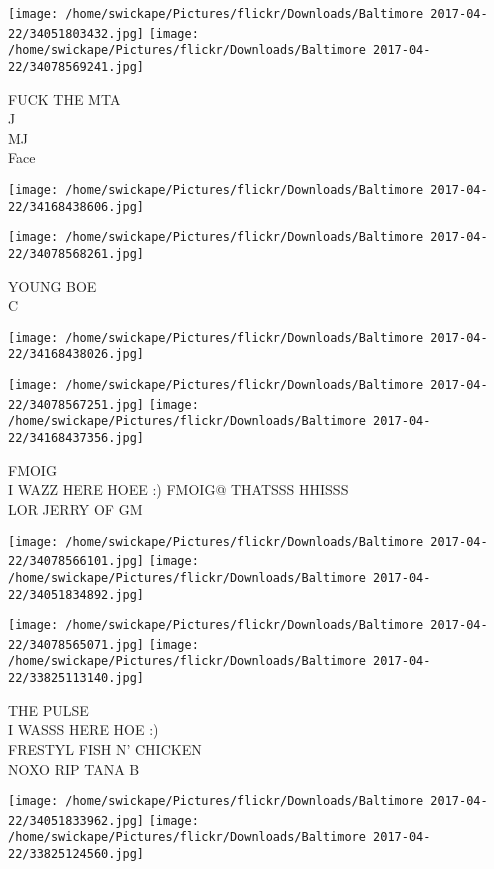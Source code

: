 \documentclass[10pt,letterpaper]{article}
\begin{document}
\texttt{[image: /home/swickape/Pictures/flickr/Downloads/Baltimore 2017-04-22/34051803432.jpg]}
\texttt{[image: /home/swickape/Pictures/flickr/Downloads/Baltimore 2017-04-22/34078569241.jpg]}

FUCK THE MTA\\
J\\
MJ\\
Face
\pagebreak

\texttt{[image: /home/swickape/Pictures/flickr/Downloads/Baltimore 2017-04-22/34168438606.jpg]}

\vspace{0.25in}
\texttt{[image: /home/swickape/Pictures/flickr/Downloads/Baltimore 2017-04-22/34078568261.jpg]}

YOUNG BOE\\
C
\pagebreak

\texttt{[image: /home/swickape/Pictures/flickr/Downloads/Baltimore 2017-04-22/34168438026.jpg]}

\vspace{0.25in}
\texttt{[image: /home/swickape/Pictures/flickr/Downloads/Baltimore 2017-04-22/34078567251.jpg]}
\texttt{[image: /home/swickape/Pictures/flickr/Downloads/Baltimore 2017-04-22/34168437356.jpg]}

FMOIG\\
I WAZZ HERE HOEE :) FMOIG@ THATSSS HHISSS\\
LOR JERRY OF GM
\pagebreak

\texttt{[image: /home/swickape/Pictures/flickr/Downloads/Baltimore 2017-04-22/34078566101.jpg]}
\texttt{[image: /home/swickape/Pictures/flickr/Downloads/Baltimore 2017-04-22/34051834892.jpg]}

\texttt{[image: /home/swickape/Pictures/flickr/Downloads/Baltimore 2017-04-22/34078565071.jpg]}
\texttt{[image: /home/swickape/Pictures/flickr/Downloads/Baltimore 2017-04-22/33825113140.jpg]}

THE PULSE\\
I WASSS HERE HOE :)\\
FRESTYL FISH N' CHICKEN\\
NOXO RIP TANA B
\pagebreak

\texttt{[image: /home/swickape/Pictures/flickr/Downloads/Baltimore 2017-04-22/34051833962.jpg]}
\texttt{[image: /home/swickape/Pictures/flickr/Downloads/Baltimore 2017-04-22/33825124560.jpg]}
\end{document}
